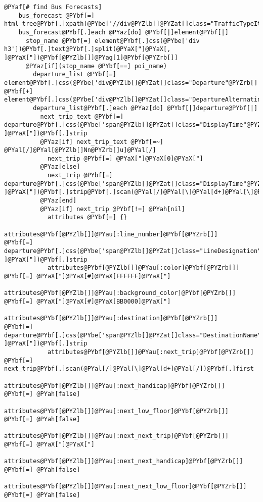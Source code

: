 \begin{Verbatim}[commandchars=@\[\]]
    @PYaf[# find Bus Forecasts]
    bus_forecast @PYbf[=] html_tree@PYbf[.]xpath(@PYbe['//div@PYZlb[]@PYZat[]class="TrafficTypeItem"@PYZrb[]'])
    bus_forecast@PYbf[.]each @PYaz[do] @PYbf[|]element@PYbf[|]
      stop_name @PYbf[=] element@PYbf[.]css(@PYbe['div h3'])@PYbf[.]text@PYbf[.]split(@PYaX["]@PYaX[, ]@PYaX["])@PYbf[@PYZlb[]]@PYag[1]@PYbf[@PYZrb[]]
      @PYaz[if](stop_name @PYbf[==] poi_name)
        departure_list @PYbf[=] element@PYbf[.]css(@PYbe['div@PYZlb[]@PYZat[]class="Departure"@PYZrb[]']) @PYbf[+] element@PYbf[.]css(@PYbe['div@PYZlb[]@PYZat[]class="DepartureAlternating"@PYZrb[]'])
        departure_list@PYbf[.]each @PYaz[do] @PYbf[|]departure@PYbf[|]
          next_trip_text @PYbf[=] departure@PYbf[.]css(@PYbe['span@PYZlb[]@PYZat[]class="DisplayTime"@PYZrb[]'])@PYbf[.]text@PYbf[.]squeeze(@PYaX["]@PYaX[ ]@PYaX["])@PYbf[.]strip
          @PYaz[if] next_trip_text @PYbf[=~] @PYal[/]@PYal[@PYZlb[]Nn@PYZrb[]u]@PYal[/]
            next_trip @PYbf[=] @PYaX["]@PYaX[0]@PYaX["]
          @PYaz[else]
            next_trip @PYbf[=] departure@PYbf[.]css(@PYbe['span@PYZlb[]@PYZat[]class="DisplayTime"@PYZrb[]'])@PYbf[.]text@PYbf[.]squeeze(@PYaX["]@PYaX[ ]@PYaX["])@PYbf[.]strip@PYbf[.]scan(@PYal[/]@PYal[\]@PYal[d+]@PYal[\]@PYal[smin]@PYal[/])@PYbf[.]first
          @PYaz[end]
          @PYaz[if] next_trip @PYbf[!=] @PYah[nil]
            attributes @PYbf[=] {}
            attributes@PYbf[@PYZlb[]]@PYau[:line_number]@PYbf[@PYZrb[]]       @PYbf[=] departure@PYbf[.]css(@PYbe['span@PYZlb[]@PYZat[]class="LineDesignation"@PYZrb[]'])@PYbf[.]text@PYbf[.]squeeze(@PYaX["]@PYaX[ ]@PYaX["])@PYbf[.]strip
            attributes@PYbf[@PYZlb[]]@PYau[:color]@PYbf[@PYZrb[]]             @PYbf[=] @PYaX["]@PYaX[#]@PYaX[FFFFFF]@PYaX["]
            attributes@PYbf[@PYZlb[]]@PYau[:background_color]@PYbf[@PYZrb[]]  @PYbf[=] @PYaX["]@PYaX[#]@PYaX[BB0000]@PYaX["]
            attributes@PYbf[@PYZlb[]]@PYau[:destination]@PYbf[@PYZrb[]]       @PYbf[=] departure@PYbf[.]css(@PYbe['span@PYZlb[]@PYZat[]class="DestinationName"@PYZrb[]'])@PYbf[.]text@PYbf[.]squeeze(@PYaX["]@PYaX[ ]@PYaX["])@PYbf[.]strip
            attributes@PYbf[@PYZlb[]]@PYau[:next_trip]@PYbf[@PYZrb[]]         @PYbf[=] next_trip@PYbf[.]scan(@PYal[/]@PYal[\]@PYal[d+]@PYal[/])@PYbf[.]first
            attributes@PYbf[@PYZlb[]]@PYau[:next_handicap]@PYbf[@PYZrb[]]        @PYbf[=] @PYah[false]
            attributes@PYbf[@PYZlb[]]@PYau[:next_low_floor]@PYbf[@PYZrb[]]       @PYbf[=] @PYah[false]
            attributes@PYbf[@PYZlb[]]@PYau[:next_next_trip]@PYbf[@PYZrb[]]       @PYbf[=] @PYaX["]@PYaX["]
            attributes@PYbf[@PYZlb[]]@PYau[:next_next_handicap]@PYbf[@PYZrb[]]        @PYbf[=] @PYah[false]
            attributes@PYbf[@PYZlb[]]@PYau[:next_next_low_floor]@PYbf[@PYZrb[]]       @PYbf[=] @PYah[false]


\end{Verbatim}
